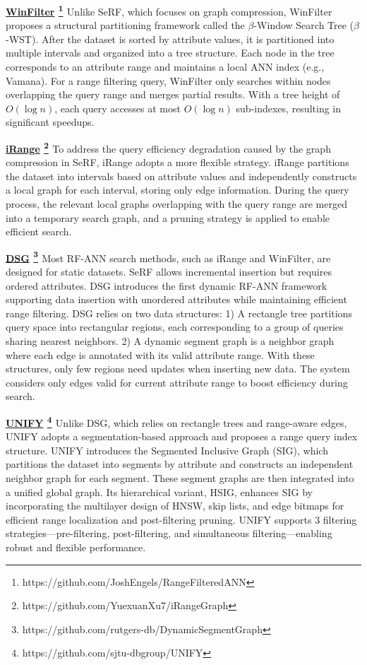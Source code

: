 \documentclass[sigconf, nonacm]{acmart}
\begin{document}
	\noindent\textbf{\underline{WinFilter} \footnote{https://github.com/JoshEngels/RangeFilteredANN} \cite{winFilter}}
	Unlike SeRF, which focuses on graph compression, WinFilter proposes a structural partitioning framework called the $\beta$-Window Search Tree ($\beta$-WST). After the dataset is sorted by attribute values, it is partitioned into multiple intervals and organized into a tree structure. Each node in the tree corresponds to an attribute range and maintains a local ANN index (e.g., Vamana). For a range filtering query, WinFilter only searches within nodes overlapping the query range and merges partial results. With a tree height of $O(\log n)$, each query accesses at most $O(\log n)$ sub-indexes, resulting in significant speedups.
	
	\noindent\textbf{\underline{iRange} \footnote{https://github.com/YuexuanXu7/iRangeGraph} \cite{iRangeGraph}}
	To address the query efficiency degradation caused by the graph compression in SeRF, iRange adopts a more flexible strategy.
	iRange partitions the dataset into intervals based on attribute values and independently constructs a local graph for each interval, storing only edge information. During the query process, the relevant local graphs overlapping with the query range are merged into a temporary search graph, and a pruning strategy is applied to enable efficient search.
	
	\noindent\textbf{\underline{DSG} \footnote{https://github.com/rutgers-db/DynamicSegmentGraph} \cite{DSG}}
	Most RF-ANN search methods, such as iRange and WinFilter, are designed for static datasets. SeRF allows incremental insertion but requires ordered attributes. DSG introduces the first dynamic RF-ANN framework supporting data insertion with unordered attributes while maintaining efficient range filtering.
	DSG relies on two data structures: 1) A rectangle tree partitions query space into rectangular regions, each corresponding to a group of queries sharing nearest neighbors. 2) A dynamic segment graph is a neighbor graph where each edge is annotated with its valid attribute range.
	With these structures, only few regions need updates when inserting new data. The system considers only edges valid for current attribute range to boost efficiency during search.
	
	\noindent\textbf{\underline{UNIFY} \footnote{https://github.com/sjtu-dbgroup/UNIFY} \cite{UNIFY}}
	Unlike DSG, which relies on rectangle trees and range-aware edges, UNIFY adopts a segmentation-based approach and proposes a range query index structure. UNIFY introduces the Segmented Inclusive Graph (SIG), which partitions the dataset into segments by attribute and constructs an independent neighbor graph for each segment. These segment graphs are then integrated into a unified global graph. Its hierarchical variant, HSIG, enhances SIG by incorporating the multilayer design of HNSW, skip lists, and edge bitmaps for efficient range localization and post-filtering pruning. UNIFY supports 3 filtering strategies—pre-filtering, post-filtering, and  simultaneous filtering—enabling robust and flexible performance.
	
\end{document}
